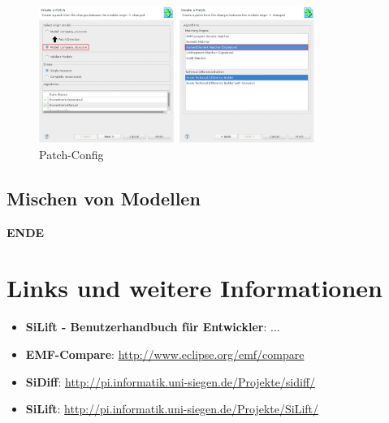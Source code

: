 \documentclass[a4paper]{scrartcl}
\begin{document}
\begin{figure}[H]
\centering
\includegraphics[width=0.8\textwidth]{graphics/silift-tutorial_patching_create_config.png}
\caption{Patch-Config}
\label{silift-tutorial_patching_create_config}
\end{figure}

\subsection{Mischen von Modellen}
\label{sec:merging}

\begin{center}
\textbf{ENDE}
\end{center}

\newpage

\section{Links und weitere Informationen}

\begin{itemize}
\item \textbf{SiLift - Benutzerhandbuch für Entwickler}: ...
\item \textbf{EMF-Compare}: \url{http://www.eclipse.org/emf/compare}
\item \textbf{SiDiff}: \url{http://pi.informatik.uni-siegen.de/Projekte/sidiff/}
\item \textbf{SiLift}: \url{http://pi.informatik.uni-siegen.de/Projekte/SiLift/}
\end{itemize} 

%
%
\end{document}

